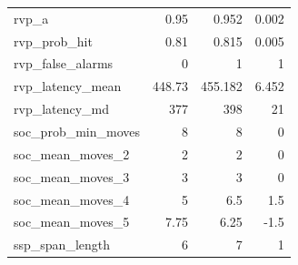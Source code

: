 \begin{longtable}{p{.47\linewidth}rrr}
{\ttfamily\footnotesize rvp\_\allowbreak{}a} & 0.95 & 0.952 & 0.002 \\
{\ttfamily\footnotesize rvp\_\allowbreak{}prob\_\allowbreak{}hit} & 0.81 & 0.815 & 0.005 \\
{\ttfamily\footnotesize rvp\_\allowbreak{}false\_\allowbreak{}alarms} & 0 & 1 & 1 \\
{\ttfamily\footnotesize rvp\_\allowbreak{}latency\_\allowbreak{}mean} & 448.73 & 455.182 & 6.452 \\
{\ttfamily\footnotesize rvp\_\allowbreak{}latency\_\allowbreak{}md} & 377 & 398 & 21 \\
{\ttfamily\footnotesize soc\_\allowbreak{}prob\_\allowbreak{}min\_\allowbreak{}moves} & 8 & 8 & 0 \\
{\ttfamily\footnotesize soc\_\allowbreak{}mean\_\allowbreak{}moves\_\allowbreak{}2} & 2 & 2 & 0 \\
{\ttfamily\footnotesize soc\_\allowbreak{}mean\_\allowbreak{}moves\_\allowbreak{}3} & 3 & 3 & 0 \\
{\ttfamily\footnotesize soc\_\allowbreak{}mean\_\allowbreak{}moves\_\allowbreak{}4} & 5 & 6.5 & 1.5 \\
{\ttfamily\footnotesize soc\_\allowbreak{}mean\_\allowbreak{}moves\_\allowbreak{}5} & 7.75 & 6.25 & -1.5 \\
{\ttfamily\footnotesize ssp\_\allowbreak{}span\_\allowbreak{}length} & 6 & 7 & 1 \\
\bottomrule\end{longtable}
